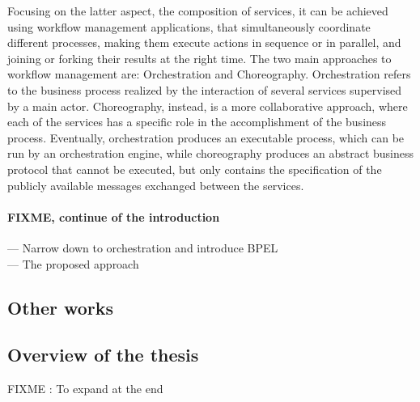 Focusing on the latter aspect, the composition of services, it can be achieved using workflow management applications, that simultaneously coordinate different processes, making them execute actions in sequence or in parallel, and joining or forking their results at the right time. %
The two main approaches to workflow management are: Orchestration and Choreography.
Orchestration refers to the %
business process realized by the interaction of several services supervised by a main actor. Choreography, instead, is a more collaborative approach, where each of the services has a specific role in the accomplishment of the business process. Eventually, orchestration produces an executable process, which can be run by an orchestration engine, while choreography produces an abstract business protocol that cannot be executed, but only contains the specification of the publicly available messages exchanged between the services.\\

\paragraph{FIXME, continue of the introduction}
--- Narrow down to orchestration and introduce BPEL \\
--- The proposed approach \\

\subsection{Other works}



\subsection{Overview of the thesis}
FIXME : To expand at the end



